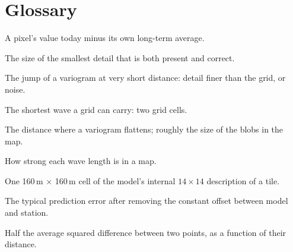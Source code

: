 \documentclass[11pt,a4paper]{article}
\begin{document}
\section*{Glossary}
\begin{description}[leftmargin=2.6cm,style=nextline]
\item[Anomaly] A pixel's value today minus its own long-term average.
\item[Effective resolution] The size of the smallest detail that is both present and correct.
\item[Nugget] The jump of a variogram at very short distance: detail finer than the grid, or noise.
\item[Nyquist limit] The shortest wave a grid can carry: two grid cells.
\item[Range] The distance where a variogram flattens; roughly the size of the blobs in the map.
\item[Spectrum] How strong each wave length is in a map.
\item[Token] One 160\,m $\times$ 160\,m cell of the model's internal $14 \times 14$ description of a tile.
\item[ubRMSE] The typical prediction error after removing the constant offset between model and station.
\item[Variogram] Half the average squared difference between two points, as a function of their distance.
\end{description}
\end{document}
